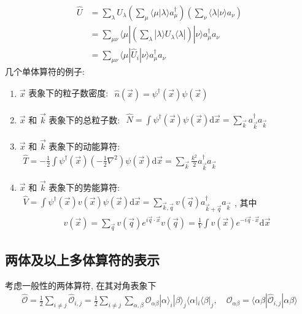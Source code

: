 \documentclass[../../main.tex]{subfiles}
\begin{document}
\begin{align*}
  \hat{U} &= \sum_{\lambda}U_{\lambda}
  \left(\sum_{\mu}\langle\mu|\lambda\rangle a_{\mu}^{\dagger}\right)
  \left(\sum_{\nu}\langle\lambda|\nu\rangle a_{\nu}\right)\\
  &= \sum_{\mu\nu}\langle \mu|
  \left(\sum_{\lambda}|\lambda\rangle U_{\lambda}\langle\lambda|\right)
  |\nu\rangle a_{\mu}^{\dagger}a_{\nu}\\
  &= \sum_{\mu\nu}\langle\mu|\hat{U}_{i}|\nu\rangle a_{\mu}^{\dagger}a_{\nu}
\end{align*}
几个单体算符的例子:
\begin{enumerate}
  \item $\vec{x}$ 表象下的粒子数密度: $\begin{aligned}
    \hat{n}(\vec{x}) = \psi^{\dagger}(\vec{x})\psi(\vec{x})
  \end{aligned}$
  \item $\vec{x}$ 和 $\vec{k}$ 表象下的总粒子数: $\begin{aligned}
    \hat{N} = \int\psi^{\dagger}(\vec{x})\psi(\vec{x})\mathrm{d}\vec{x} = \sum_{\vec{k}}a_{\vec{k}}^{\dagger}a_{\vec{k}}
  \end{aligned}$
  \item $\vec{x}$ 和 $\vec{k}$ 表象下的动能算符: $\begin{aligned}
    \hat{T} = -\frac{1}{2}\int\psi^{\dagger}(\vec{x})\left(-\frac{1}{2}\nabla^{2}\right)\psi(\vec{x})\mathrm{d}\vec{x} = \sum_{\vec{k}}\frac{k^{2}}{2}a_{\vec{k}}^{\dagger}a_{\vec{k}}
  \end{aligned}$
  \item $\vec{x}$ 和 $\vec{k}$ 表象下的势能算符: $\begin{aligned}
    \hat{V} = \int\psi^{\dagger}(\vec{x})v(\vec{x})\psi(\vec{x})\mathrm{d}\vec{x} = \sum_{\vec{k},\vec{q}}v(\vec{q})a_{\vec{k} + \vec{q}}^{\dagger}a_{\vec{k}}
  \end{aligned}$, 其中 
  \begin{align*}
    v(\vec{x}) = \sum_{\vec{q}}v(\vec{q})e^{i\vec{q}\cdot\vec{x}}
    v(\vec{q}) = \frac{1}{V}\int v(\vec{x})e^{-i\vec{q}\cdot\vec{x}}\mathrm{d}\vec{x}
  \end{align*}
\end{enumerate}

\subsection{两体及以上多体算符的表示}
考虑一般性的两体算符, 在其对角表象下
\begin{align*}
  \hat{\mathcal{O}} = \frac{1}{2}\sum_{i\neq j}\hat{\mathcal{O}}_{i,j} = \frac{1}{2}\sum_{i\neq j}\sum_{\alpha,\beta}\mathcal{O}_{\alpha\beta}|\alpha\rangle_{i}|\beta\rangle_{j}\langle\alpha|_{i}\langle\beta|_{j},\quad \mathcal{O}_{\alpha\beta} = \langle\alpha\beta|\hat{\mathcal{O}}_{i,j}|\alpha\beta\rangle
\end{align*}
\end{document}
